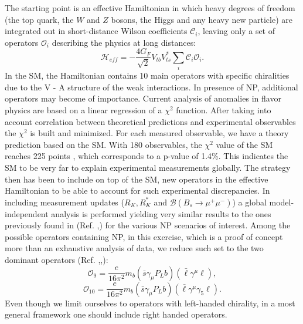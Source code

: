 \documentclass[a4paper,fleqn]{cas-dc}
\begin{document}
The starting point is an effective Hamiltonian in which heavy degrees of freedom (the top quark, the \(W\) and \(Z\) bosons, the Higgs and any heavy new particle) are integrated out in short-distance Wilson coefficients \( \mathcal{C}_i \), leaving only a set of operators \(\mathcal{O}_i \) describing the physics at long distances:
\[
\mathcal{H}_{eff} = -\frac{4G_F}{\sqrt{2}}V_{tb}V^*_{ts}\sum_{i}\mathcal{C}_i\mathcal{O}_i.
\]
In the SM, the Hamiltonian contains 10 main operators with specific chiralities due to the V - A structure
of the weak interactions. In presence of NP, additional
operators may become of importance. Current analysis of anomalies in flavor physics are based on a linear regression of a \(\chi^2 \) function. After taking into account correlation between
theoretical predictions and experimental observables the \(\chi^2 \) is built
and minimized. 
For each measured observable, we have a theory prediction based on the SM. 
With 180 observables, the \(\chi^2 \) value
of the SM reaches 225 points \cite{Alguer__2019}, which corresponds to a p-value of 1.4\%.
This indicates the SM to be very far to explain experimental measurements globally.
The strategy then has been to include on top of the SM, new operators
in the effective Hamiltonian to be able to account for such experimental discrepancies.
In \cite{Alguer__2019} including measurement updates (\(R_K, R_K^*\) and \(\mathcal{B}(B_s \rightarrow \mu^+\mu^-) \))
 a global model-independent analysis is performed yielding very similar results to the ones previously found in (Ref. \cite{capdevila2017patterns},\cite{Descotes_Genon_2016}) for the various NP scenarios of interest.
Among the possible operators containing NP, in this exercise, which is a proof of concept more than an exhaustive analysis of data, we reduce such set to the two dominant operators (Ref. \cite{Alguer__2019},\cite{Alguero__2019},\cite{capdevila2017patterns}):
\[
\mathcal{O}_9 = \frac{e}{16\pi^2}m_b(\bar{s}\gamma_{\mu}P_Lb)(\bar{\ell}\gamma^{\mu}\ell),
\]
\[
\mathcal{O}_{10} = \frac{e}{16\pi^2}m_b(\bar{s}\gamma_{\mu}P_Lb)(\bar{\ell}\gamma^{\mu}\gamma_{5}\ell).
\]
Even though we limit ourselves to operators with left-handed chirality, in a most general framework one should include right handed operators.
\end{document}
